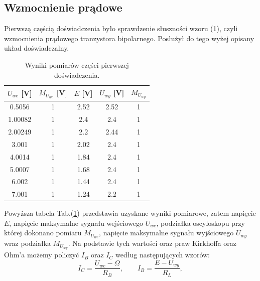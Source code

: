 \documentclass[10pt,a4paper]{article}
\begin{document}
\subsection*{Wzmocnienie prądowe}
Pierwszą częścią doświadczenia było sprawdzenie słuszności wzoru (1), czyli wzmocnienia prądowego tranzystora bipolarnego. Posłużył do tego wyżej opisany układ doświadczalny.
\begin{table}[htp!]
\begin{center}
\begin{tabular}{|c|c|c|c|c|}
\hline
 $U_{we}$ [V] & $M_{U_{we}}$ [V] & $E$ [V] & $U_{wy}$ [V] & $M_{U_{wy}}$ \\
\hline
0.5056      & 1                      & 2.52                          & 2.52             & 1                      \\
1.00082     & 1                      & 2.4                           & 2.4              & 1                      \\
2.00249     & 1                      & 2.2                           & 2.44             & 1                      \\
3.001       & 1                      & 2.02                          & 2.4              & 1                      \\
4.0014      & 1                      & 1.84                          & 2.4              & 1                      \\
5.0007      & 1                      & 1.68                          & 2.4              & 1                      \\
6.002       & 1                      & 1.44                          & 2.4              & 1                      \\
7.001       & 1                      & 1.24                          & 2.2              & 1     \\     
\hline  
\end{tabular}
\end{center}
\caption{Wyniki pomiarów części pierwszej doświadczenia.}
\label{czesc1}
\end{table}
Powyższa tabela Tab.(\ref{czesc1}) przedstawia uzyskane wyniki pomiarowe, zatem napięcie $E$, napięcie maksymalne sygnału wejściowego $U_{we}$, podziałka oscyloskopu przy której dokonano pomiaru $M_{U_{we}}$, napięcie maksymalne sygnału wyjściowego $U_{wy}$ wraz podziałka $M_{U_{wy}}$. Na podstawie tych wartości oraz praw Kirkhoffa oraz Ohm'a możemy policzyć $I_B$ oraz $I_C$ według następujących wzorów:
$$ I_C = \frac{U_{we} - \Omega}{R_B}, \qquad I_B = \frac{E-U_{wy}}{R_L}, $$
\end{document}
